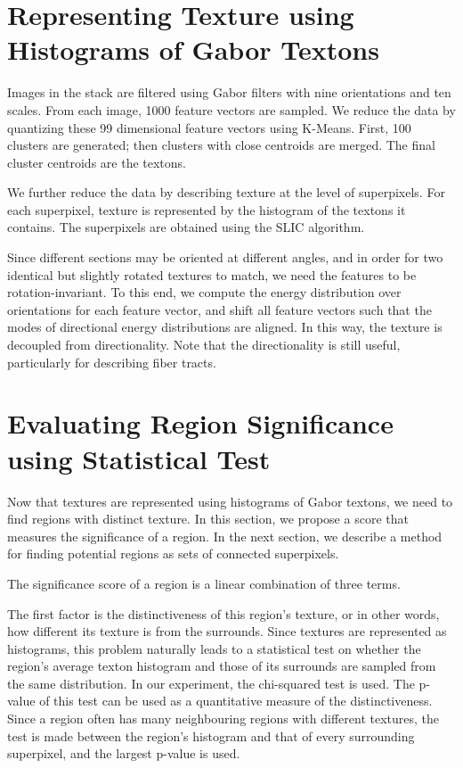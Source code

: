\documentclass{llncs}
\begin{document}
\section{Representing Texture using Histograms of Gabor Textons} 

Images in the stack are filtered using Gabor filters with nine orientations and ten scales. From each image, 1000 feature vectors are sampled. We reduce the data by quantizing these 99 dimensional feature vectors using K-Means. First, 100 clusters are generated; then clusters with close centroids are merged. The final cluster centroids are the textons. 


We further reduce the data by describing texture at the level of superpixels. For each superpixel, texture is represented by the histogram of the textons it contains. The superpixels are obtained using the SLIC algorithm. 

Since different sections may be oriented at different angles, and in order for two identical but slightly rotated textures to match, we need the features to be rotation-invariant. To this end, we compute the energy distribution over orientations for each feature vector, and shift all feature vectors such that the modes of directional energy distributions are aligned. In this way, the texture is decoupled from directionality. Note that the directionality is still useful, particularly for describing fiber tracts.

\section{Evaluating Region Significance using Statistical Test}

Now that textures are represented using histograms of Gabor textons, we need to find regions with distinct texture. In this section, we propose a score that measures the significance of a region. In the next section, we describe a method for finding potential regions as sets of connected superpixels. 

The significance score of a region is a linear combination of three terms. 

The first factor is the distinctiveness of this region's texture, or in other words, how different its texture is from the surrounds. Since textures are represented as histograms, this problem naturally leads to a statistical test on whether the region's average texton histogram and those of its surrounds are sampled from the same distribution. In our experiment, the chi-squared test is used. The p-value of this test can be used as a quantitative measure of the distinctiveness. Since a region often has many neighbouring regions with different textures, the test is made between the region's histogram and that of every surrounding superpixel, and the largest p-value is used. 
\end{document}
